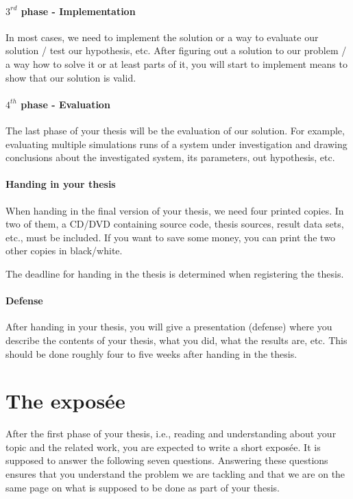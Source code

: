 \documentclass{article}
\begin{document}
\paragraph{$3^{rd}$ phase - Implementation}
In most cases, we need to implement the solution or a way to evaluate our solution / test our hypothesis, etc.
After figuring out a solution to our problem / a way how to solve it or at least parts of it, you will start to implement means to show that our solution is valid.

\paragraph{$4^{th}$ phase - Evaluation}
The last phase of your thesis will be the evaluation of our solution.
For example, evaluating multiple simulations runs of a system under investigation and drawing conclusions about the investigated system, its parameters, out hypothesis, etc.

\paragraph{Handing in your thesis}

When handing in the final version of your thesis, we need four printed copies.
In two of them, a CD/DVD containing source code, thesis sources, result data sets, etc., must be included.
If you want to save some money, you can print the two other copies in black/white.

The deadline for handing in the thesis is determined when registering the thesis.


\paragraph{Defense}

After handing in your thesis, you will give a presentation (defense) where you describe the contents of your thesis, what you did, what the results are, etc.
This should be done roughly four to five weeks after handing in the thesis.






\section{The expos\'{e}e}
\label{sec:exposee}

After the first phase of your thesis, i.e., reading and understanding about your topic and the related work, you are expected to write a short expos\'{e}e.
It is supposed to answer the following seven questions.
Answering these questions ensures that you understand the problem we are tackling and that we are on the same page on what is supposed to be done as part of your thesis.
\end{document}
